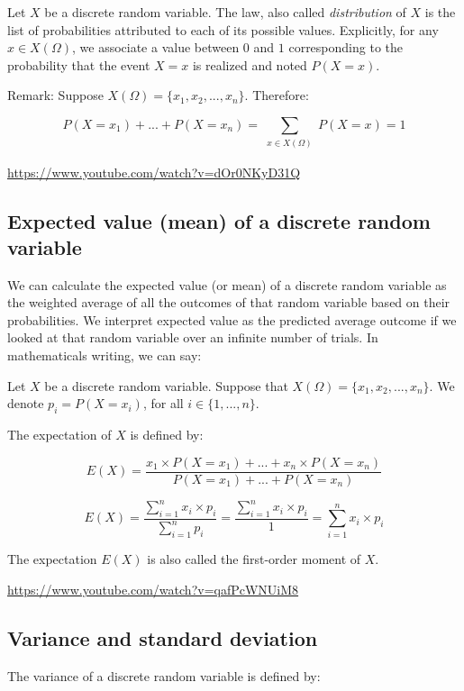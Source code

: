 \documentclass[
  letterpaper,
  DIV=11,
  numbers=noendperiod]{scrreprt}
\begin{document}
Let \(X\) be a discrete random variable. The law, also called
\emph{distribution} of \(X\) is the list of probabilities attributed to
each of its possible values. Explicitly, for any \(x \in X(\Omega)\), we
associate a value between \(0\) and \(1\) corresponding to the
probability that the event \(X = x\) is realized and noted \(P(X = x)\).

Remark: Suppose \(X(\Omega) = \{x_1, x_2, ..., x_n\}\). Therefore:

\[P( X = x_1) + ... + P(X = x_n) =  \sum_{\substack{x \in X(\Omega)}} P(X = x) = 1\]

\url{https://www.youtube.com/watch?v=dOr0NKyD31Q}

\subsection{Expected value (mean) of a discrete random
variable}\label{expected-value-mean-of-a-discrete-random-variable}

We can calculate the expected value (or mean) of a discrete random
variable as the weighted average of all the outcomes of that random
variable based on their probabilities. We interpret expected value as
the predicted average outcome if we looked at that random variable over
an infinite number of trials. In mathematicals writing, we can say:

Let \(X\) be a discrete random variable. Suppose that
\(X(\Omega) = \{x_1, x_2, ..., x_n\}\). We denote \(p_i = P(X = x_i)\),
for all \(i \in \{1, ..., n\}\).

The expectation of \(X\) is defined by:

\[E(X) = \frac{x_1 \times P(X = x_1) + ... + x_n \times P(X = x_n)}{P(X = x_1) + ... + P(X = x_n)}\]

\[E(X) = \frac{\sum_{i = 1}^n x_i \times p_i}{\sum_{i = 1}^n p_i} = \frac{\sum_{i = 1}^n x_i \times p_i}{1} = \sum_{i = 1}^n x_i \times p_i\]

The expectation \(E(X)\) is also called the first-order moment of \(X\).

\url{https://www.youtube.com/watch?v=qafPcWNUiM8}

\subsection{Variance and standard
deviation}\label{variance-and-standard-deviation}

The variance of a discrete random variable is defined by:
\end{document}
